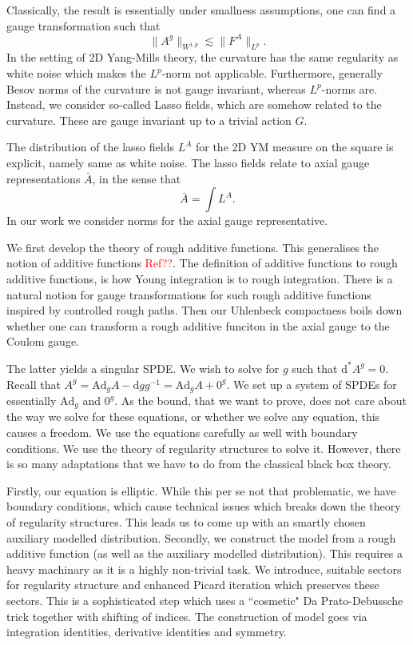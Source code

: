 \documentclass[12pt]{article}
\numberwithin{equation}{section}
\theoremstyle{definition}
\theoremstyle{remark}
\newcommand{\Ad}{\mathrm{Ad}}
\newcommand{\diff}{\mathrm{d}}
\newcommand{\1}{\mathbf 1}
\newcommand{\<}{\langle}
\renewcommand{\>}{\rangle}
\newcommand{\red}[1]{\textcolor{red}{#1}}
\begin{document}
Classically, the result is essentially under smallness assumptions, one can find a gauge transformation such that 
\[
\|A^g\|_{W^{1,p}}\lesssim \|F^A\|_{L^p}.
\]
In the setting of 2D Yang-Mills theory, the curvature has the same regularity as white noise which makes the $L^p$-norm not applicable. Furthermore, generally Besov norms of the curvature is not gauge invariant, whereas $L^p$-norms are. Instead, we consider so-called Lasso fields, which are somehow related to the curvature. These are gauge invariant up to a trivial action $G$. 

The distribution of the lasso fields $L^A$ for the 2D YM measure on the square is explicit, namely same as white noise. The lasso fields relate to axial gauge representations $\bar A$, in the sense that 
\[
\bar A=\int L^A. 
\]
In our work we consider norms for the axial gauge representative. 

We first develop the theory of rough additive functions. This generalises the notion of additive functions \red{Ref??}. The definition of additive functions to rough additive functions, is how Young integration is to rough integration. There is a natural notion for gauge transformations for such rough additive functions inspired by controlled rough paths. Then our Uhlenbeck compactness boils down whether one can transform a rough additive funciton in the axial gauge to the Coulom gauge. 

The latter yields a singular SPDE. We wish to solve for $g$ such that $\diff^*A^g=0$. Recall that $A^g=\Ad_gA-\diff gg^{-1}=\Ad_gA+0^g$. We set up a system of SPDEs for essentially $\Ad_g$ and $0^g$. As the bound, that we want to prove, does not care about the way we solve for these equations, or whether we solve any equation, this causes a freedom. We use the equations carefully as well with boundary conditions. We use the theory of regularity structures to solve it. However, there is so many adaptations that we have to do from the classical black box theory. 


Firstly, our equation is elliptic. While this per se not that problematic, we have boundary conditions, which cause technical issues which breaks down the theory of regularity structures. This leads us to come up with an smartly chosen auxiliary modelled distribution.  Secondly, we construct the model from a rough additive function (as well as the auxiliary modelled distribution). This requires a heavy machinary as it is a highly non-trivial task. We introduce, suitable sectors for regularity structure and enhanced Picard iteration which preserves these sectors. This is a sophisticated step which uses a ``cosmetic" Da Prato-Debussche trick together with shifting of indices.   The construction of model goes via integration identities, derivative identities and symmetry.  
\end{document}
